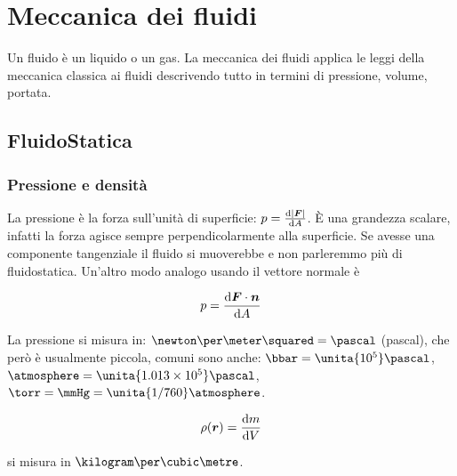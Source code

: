 \chapter{Meccanica dei fluidi}
Un fluido è un liquido o un gas. La meccanica dei fluidi applica le leggi della meccanica classica ai fluidi descrivendo tutto in termini di pressione, volume, portata.
\section{FluidoStatica}
\subsection{Pressione e densità}
La pressione è la forza sull'unità di superficie: $p=\frac{\mathrm{d} |\boldsymbol{F}|}{\mathrm{d} A}$. \`E una grandezza scalare, infatti la forza agisce sempre perpendicolarmente alla superficie. Se avesse una componente tangenziale il fluido si muoverebbe e non parleremmo più di fluidostatica. Un'altro modo analogo usando il vettore normale è
\begin{Def}[pressione]
\begin{equation}
p=\frac{\mathrm{d}\boldsymbol{F}\cdot \boldsymbol{n}}{\mathrm{d} A}
\end{equation}
\end{Def}
La pressione si misura in: $\newton\per\meter\squared=\pascal$ (pascal), che però è usualmente piccola, comuni sono anche: $\bbar=\unita{10^5}\pascal$, $\atmosphere=\unita{1.013\times 10^5}\pascal$, $\torr=\mmHg=\unita{1/760}\atmosphere$.
\begin{Def}
\begin{equation}
\rho(\boldsymbol{r})=\frac{\mathrm{d} m}{\mathrm{d} V}
\end{equation}
\end{Def}
si misura in $\kilogram\per\cubic\metre$.

